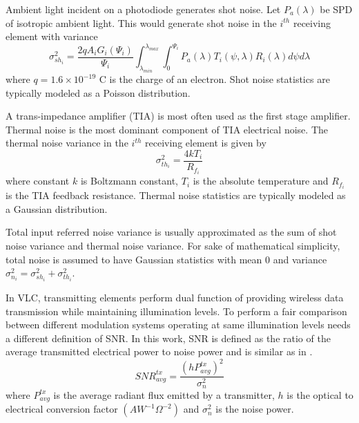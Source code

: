 Ambient light incident on a photodiode generates shot noise. Let $P_a(\lambda)$ be SPD of isotropic ambient light. This would generate shot noise in the $i^{th}$ receiving element with variance
\begin{equation}
	\label{eqNshot}
	\sigma_{sh_i}^{2} = \frac{2qA_iG_i(\Psi_i)}{\Psi_i}\int_{\lambda_{min}}^{\lambda_{max}}\int_{0}^{\Psi_i}P_{a}(\lambda)T_i(\psi,\lambda)R_i(\lambda)d\psi d\lambda
\end{equation}
where $q=1.6\times 10^{-19}$ C is the charge of an electron. Shot noise statistics are typically modeled as a Poisson distribution. 

A trans-impedance amplifier (TIA) is most often used as the first stage amplifier. Thermal noise is the most dominant component of TIA electrical noise. The thermal noise variance in the $i^{th}$ receiving element is given by
\begin{equation}
	\label{eqNth}
	\sigma_{th_i}^{2} = \frac{4kT_i}{R_{f_i}}
\end{equation}
where constant $k$ is Boltzmann constant, $T_i$ is the absolute temperature and $R_{f_i}$ is the TIA feedback resistance. Thermal noise statistics are typically modeled as a Gaussian distribution.

Total input referred noise variance is usually approximated as the sum of shot noise variance and thermal noise variance.  For sake of mathematical simplicity, total noise is assumed to have Gaussian statistics with mean $0$ and variance $\sigma_{n_i}^{2} = \sigma_{sh_i}^{2} + \sigma_{th_i}^{2}$.

In VLC, transmitting elements perform dual function of providing wireless data transmission while maintaining illumination levels. To perform a fair comparison between different modulation systems operating at same illumination levels needs a different definition of SNR. In this work, SNR is defined as the ratio of the average transmitted electrical power to noise power and is similar as in \cite{fat13a}. 
\begin{equation}
	\label{eqSNR}
	SNR^{tx}_{avg} = \frac{(hP_{avg}^{tx})^2}{\sigma_n^{2}}
\end{equation}
where $P_{avg}^{tx}$ is the average radiant flux emitted by a transmitter, $h$ is the optical to electrical conversion factor $(AW^{-1}\Omega^{-2})$ and $\sigma_n^{2}$ is the noise power.